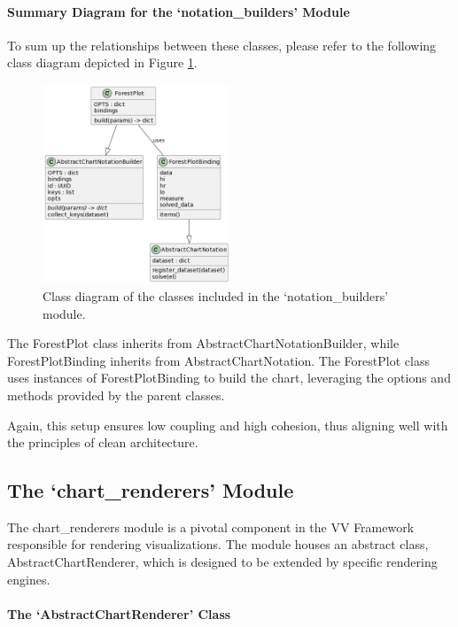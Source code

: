 \paragraph{Summary Diagram for the `notation\_builders'
Module}\label{summary-diagram-for-the-notation_builders-module}

To sum up the relationships between these classes, please refer to the
following class diagram depicted in Figure \ref{fig:class_diag2}.

\begin{figure}[!ht]
  \centering
  \includegraphics[width=0.5\textwidth]{media/fig12.png}
  \caption{Class diagram of the classes included in the
  `notation\_builders' module.}
  \label{fig:class_diag2}
\end{figure}

The ForestPlot class inherits from AbstractChartNotationBuilder, while
ForestPlotBinding inherits from AbstractChartNotation. The ForestPlot
class uses instances of ForestPlotBinding to build the chart, leveraging
the options and methods provided by the parent classes.

Again, this setup ensures low coupling and high cohesion, thus aligning
well with the principles of clean architecture.

\subsection{The `chart\_renderers'
Module}\label{the-chart_renderers-module}

The chart\_renderers module is a pivotal component in the VV Framework
responsible for rendering visualizations. The module houses an abstract
class, AbstractChartRenderer, which is designed to be extended by
specific rendering engines.

\paragraph{The `AbstractChartRenderer'
Class}\label{the-abstractchartrenderer-class}

